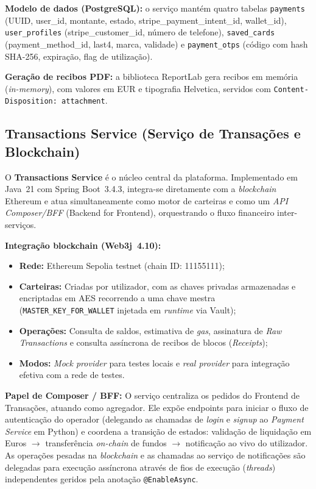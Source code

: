 \documentclass[12pt,a4paper]{article}
\begin{document}
\textbf{Modelo de dados (PostgreSQL):} o serviço mantém quatro tabelas 
\texttt{payments} (UUID, user\_id, montante, estado, stripe\_payment\_intent\_id,
wallet\_id), \texttt{user\_profiles} (\allowbreak stripe\_customer\_id, número de telefone), 
\texttt{saved\_cards} (payment\_method\_id, last4, marca, validade) e
\texttt{payment\_otps} (código com hash SHA-256, expiração, flag de utilização).

\textbf{Geração de recibos PDF:} a biblioteca ReportLab gera recibos em memória
(\emph{in-memory}), com valores em EUR e tipografia Helvetica, servidos com
\texttt{Content-Disposition: attachment}.

\subsection{Transactions Service (Serviço de Transações e Blockchain)}

O \textbf{Transactions Service} é o núcleo central da plataforma. Implementado em
Java~21 com Spring Boot~3.4.3, integra-se diretamente com a \emph{blockchain} Ethereum e atua 
simultaneamente como motor de carteiras e como um \emph{API Composer/BFF} (Backend for Frontend), orquestrando o fluxo financeiro inter-serviços.

\textbf{Integração blockchain (Web3j~4.10):}
\begin{itemize}[noitemsep]
  \item \textbf{Rede:} Ethereum Sepolia testnet (chain ID: 11155111);
  \item \textbf{Carteiras:} Criadas por utilizador, com as chaves privadas armazenadas 
        e encriptadas em AES recorrendo a uma chave mestra (\texttt{MASTER\_KEY\_FOR\_WALLET} 
        injetada em \emph{runtime} via Vault);
  \item \textbf{Operações:} Consulta de saldos, estimativa de \emph{gas}, assinatura de 
        \emph{Raw Transactions} e consulta assíncrona de recibos de blocos (\emph{Receipts});
  \item \textbf{Modos:} \emph{Mock provider} para testes locais e \emph{real provider} para 
        integração efetiva com a rede de testes.
\end{itemize}

\textbf{Papel de Composer / BFF:} O serviço centraliza os pedidos do Frontend de Transações, 
atuando como agregador. Ele expõe endpoints para iniciar o fluxo de autenticação do operador 
(delegando as chamadas de \emph{login} e \emph{signup} ao \emph{Payment Service} em Python) 
e coordena a transição de estados: validação de liquidação em Euros $\rightarrow$ transferência 
\emph{on-chain} de fundos $\rightarrow$ notificação ao vivo do utilizador. As operações pesadas na \emph{blockchain} e as chamadas ao serviço de notificações são delegadas para execução assíncrona através de fios de execução (\emph{threads}) independentes geridos pela anotação \texttt{@EnableAsync}.
\end{document}

